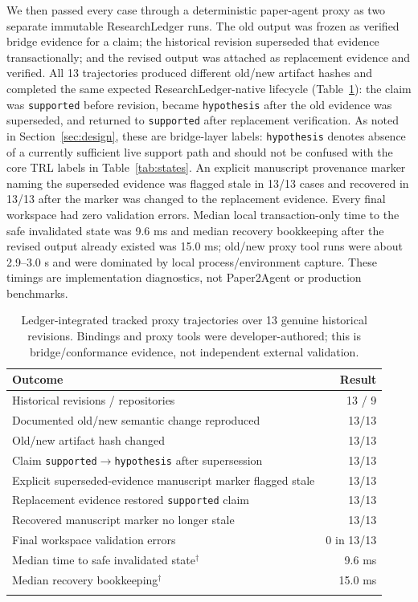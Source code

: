 \documentclass[cmc,article,submit,moreauthors,pdftex]{Definitions/tsp}
\begin{document}
We then passed every case through a deterministic paper-agent proxy as two separate immutable ResearchLedger runs. The old output was frozen as verified bridge evidence for a claim; the historical revision superseded that evidence transactionally; and the revised output was attached as replacement evidence and verified. All 13 trajectories produced different old/new artifact hashes and completed the same expected ResearchLedger-native lifecycle (Table~\ref{tab:tracked_proxy}): the claim was \texttt{supported} before revision, became \texttt{hypothesis} after the old evidence was superseded, and returned to \texttt{supported} after replacement verification. As noted in Section~\ref{sec:design}, these are bridge-layer labels: \texttt{hypothesis} denotes absence of a currently sufficient live support path and should not be confused with the core TRL labels in Table~\ref{tab:states}. An explicit manuscript provenance marker naming the superseded evidence was flagged stale in 13/13 cases and recovered in 13/13 after the marker was changed to the replacement evidence. Every final workspace had zero validation errors. Median local transaction-only time to the safe invalidated state was 9.6 ms and median recovery bookkeeping after the revised output already existed was 15.0 ms; old/new proxy tool runs were about 2.9--3.0 s and were dominated by local process/environment capture. These timings are implementation diagnostics, not Paper2Agent or production benchmarks.

\begin{table}[t]
\centering
\caption{Ledger-integrated tracked proxy trajectories over 13 genuine historical revisions. Bindings and proxy tools were developer-authored; this is bridge/conformance evidence, not independent external validation.}
\label{tab:tracked_proxy}
\scriptsize
\begin{tabularx}{\columnwidth}{>{\raggedright\arraybackslash}Xr}
\toprule
Outcome & Result \\
\midrule
Historical revisions / repositories & 13 / 9 \\
Documented old/new semantic change reproduced & 13/13 \\
Old/new artifact hash changed & 13/13 \\
Claim \texttt{supported}$\to$\texttt{hypothesis} after supersession & 13/13 \\
Explicit superseded-evidence manuscript marker flagged stale & 13/13 \\
Replacement evidence restored \texttt{supported} claim & 13/13 \\
Recovered manuscript marker no longer stale & 13/13 \\
Final workspace validation errors & 0 in 13/13 \\
Median time to safe invalidated state$^\dagger$ & 9.6 ms \\
Median recovery bookkeeping$^\dagger$ & 15.0 ms \\
\bottomrule
\multicolumn{2}{l}{\scriptsize $^\dagger$Excludes generation of the revised tool output; local proxy diagnostic only.}
\end{tabularx}
\end{table}
\end{document}

